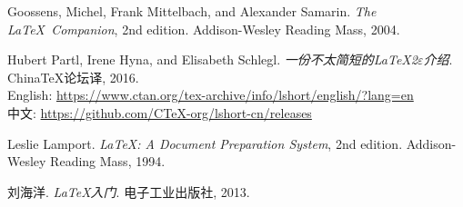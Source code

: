 \begin{thebibliography}{9}

 Goossens, Michel, Frank Mittelbach, and Alexander Samarin.
  \newblock \emph{The \LaTeX\ Companion}, 2nd edition.
  \newblock Addison-Wesley Reading Mass, 2004.

 Hubert Partl, Irene Hyna, and Elisabeth Schlegl.
  \newblock \emph{一份不太简短的\LaTeX 2$\varepsilon$介绍}.
  \newblock China\TeX 论坛译, 2016. \\
  English: \url{https://www.ctan.org/tex-archive/info/lshort/english/?lang=en}\\
  中文: \url{https://github.com/CTeX-org/lshort-cn/releases}
    
 Leslie Lamport.
  \newblock \emph{\LaTeX: A Document Preparation System}, 2nd edition.
  \newblock Addison-Wesley Reading Mass, 1994.
  
 刘海洋.
  \newblock \emph{\LaTeX 入门}.
  \newblock 电子工业出版社, 2013.
  
\end{thebibliography}